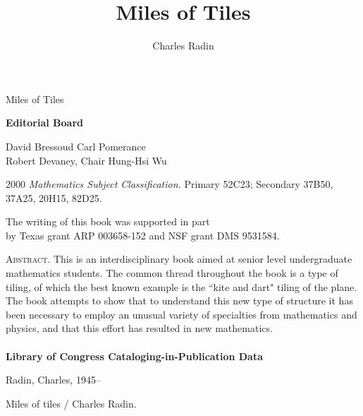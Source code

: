 \documentclass[reqno]{stml-l}
\theoremstyle{plain}
\newenvironment{copyrightpage}{\clearpage\null\thispagestyle{empty}}{\thispagestyle{empty}\clearpage}
\theoremstyle{definition}
\numberwithin{equation}{chapter}
\begin{document}
\begin{titlepage}
Miles of Tiles
\end{titlepage}

\title{Miles of Tiles}

\author{Charles Radin}


\maketitle

\begin{copyrightpage}
\begin{center}
\textbf{Editorial Board}
\end{center}

\begin{center}
David Bressoud \hfill Carl Pomerance\\
Robert Devaney, Chair \hfill Hung-Hsi Wu\\
\end{center}

\begin{center}
2000 \emph{Mathematics Subject Classification.} Primary 52C23; Secondary 37B50, 37A25, 20H15, 82D25.
\end{center}

\begin{center}
The writing of this book was supported in part\\
by Texas grant ARP 003658-152 and NSF grant DMS 9531584.
\end{center}


\noindent \textsc{Abstract}. This is an interdisciplinary book aimed at senior level undergraduate mathematics students. The common thread throughout the book is a type of tiling, of which the best known example is the ``kite and dart" tiling of the plane. The book attempts to show that to understand this new type of structure it has been necessary to employ an unusual variety of specialties from mathematics and physics, and that this effort has resulted in new mathematics.\\

\hrulefill\\

\noindent \textbf{Library of Congress Cataloging-in-Publication Data}

\noindent Radin, Charles, 1945--

Miles of tiles / Charles Radin.


\end{copyrightpage}
\end{document}
